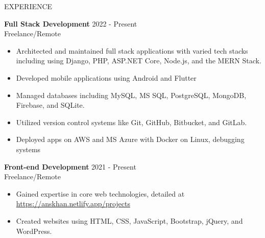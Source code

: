 \documentclass{resume} %
\begin{document}
\begin{rSection}{EXPERIENCE}

\textbf{Full Stack Development} \hfill 2022 - Present\\
Freelance/Remote %
 \begin{itemize}
    \itemsep -3pt {} 
     \item Architected and maintained full stack applications with varied tech stacks including using Django, PHP, ASP.NET Core, Node.js, and the MERN Stack.
     \item Developed mobile applications using Android and Flutter
     \item Managed databases including MySQL, MS SQL, PostgreSQL, MongoDB, Firebase, and SQLite. \item Utilized version control systems like Git, GitHub, Bitbucket, and GitLab.
     \item Deployed apps on AWS and MS Azure with Docker on Linux, debugging systems 
 \end{itemize}


\textbf{Front-end Development} \hfill 2021  - Present\\
Freelance/Remote  \hfill %
 \begin{itemize}
    \itemsep -3pt {} 
     \item Gained expertise in core web technologies, detailed at  \href{https://anskhan.netlify.app/projects}{https://anskhan.netlify.app/projects}
     \item Created websites using HTML, CSS, JavaScript, Bootstrap, jQuery, and WordPress.
   
 \end{itemize}
 

\end{rSection} 

\end{document}
